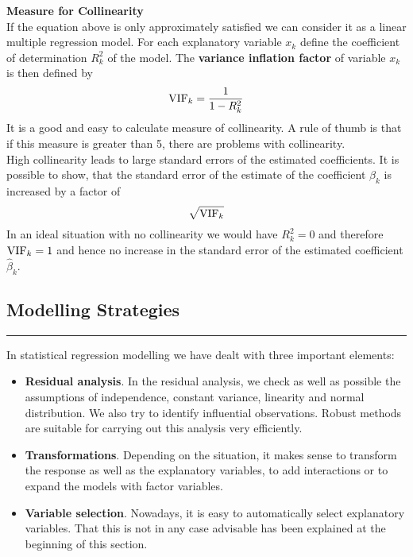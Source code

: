 \textbf{Measure for Collinearity}\\
If the equation above is only approximately satisfied we can consider it as a linear multiple regression model. For each explanatory variable $x_k$ define the coefficient of determination $R^2_k$ of the model. The \textbf{variance inflation factor} of variable $x_k$ is then defined by
\begin{equation}
  \textup{VIF}_k = \frac{1}{1-R^2_k}
\end{equation}
It is a good and easy to calculate measure of collinearity. A rule of thumb is that if this measure is greater than 5, there are problems with collinearity.\\
High collinearity leads to large standard errors of the estimated coefficients. It is possible to show, that the standard error of the estimate of the coefficient $\beta_k$ is increased by a factor of
\begin{equation}
  \sqrt{\textup{VIF}_k}
\end{equation}
In an ideal situation with no collinearity we would have $R^2_k = 0$ and therefore $\textup{VIF}_k = 1$ and hence no increase in the standard error of the estimated coefficient $\hat{\beta}_k$.

\subsection{Modelling Strategies}
\noindent\rule[\linienAbstand]{\linewidth}{\linienDicke}
In statistical regression modelling we have dealt with three important elements:
\begin{itemize}
  \item \textbf{Residual analysis}. In the residual analysis, we check as well as possible the assumptions of independence, constant variance, linearity and normal distribution. We also try to identify influential observations. Robust methods are suitable for carrying out this analysis very efficiently.
  \item \textbf{Transformations}. Depending on the situation, it makes sense to transform the response as well as the explanatory variables, to add interactions or to expand the models with factor variables.
  \item \textbf{Variable selection}. Nowadays, it is easy to automatically select explanatory variables. That this is not in any case advisable has been explained at the beginning of this section.
\end{itemize}

